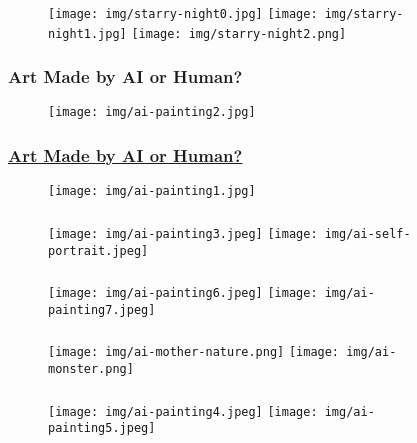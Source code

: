 \documentclass[UTF8,11pt,colorlinks,compress,openany]{beamer}%
\begin{document}
\begin{frame}\frametitle{}
\begin{figure}[H]
\texttt{[image: img/starry-night0.jpg]}
\texttt{[image: img/starry-night1.jpg]}
\texttt{[image: img/starry-night2.png]}	
\end{figure}
\end{frame}

\begin{frame}\frametitle{Art Made by AI or Human?}
\begin{figure}[H]
\texttt{[image: img/ai-painting2.jpg]}
\end{figure}
\end{frame}

\begin{frame}\frametitle{\href{http://www.aiartonline.com/}{Art Made by AI or Human?}}
\begin{figure}[H]
\texttt{[image: img/ai-painting1.jpg]}
\end{figure}
\end{frame}

\begin{frame}\frametitle{}
\begin{figure}[H]
\texttt{[image: img/ai-painting3.jpeg]}
\texttt{[image: img/ai-self-portrait.jpeg]}
\end{figure}
\end{frame}

\begin{frame}\frametitle{}
\begin{figure}[H]
\texttt{[image: img/ai-painting6.jpeg]}
\texttt{[image: img/ai-painting7.jpeg]}
\end{figure}
\end{frame}

\begin{frame}\frametitle{}
\begin{figure}[H]
\texttt{[image: img/ai-mother-nature.png]}
\texttt{[image: img/ai-monster.png]}
\end{figure}
\end{frame}

\begin{frame}\frametitle{}
\begin{figure}[H]
\texttt{[image: img/ai-painting4.jpeg]}
\texttt{[image: img/ai-painting5.jpeg]}
\end{figure}
\end{frame}
\end{document}
